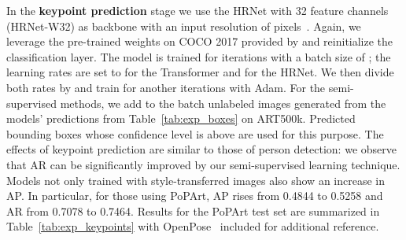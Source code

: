 \documentclass[sigconf]{acmart}
\begin{document}
\label{chp:exp_keypoint}
In the \textbf{keypoint prediction} stage we use the \acl{HRNet} with 32 feature channels (HRNet-W32) as backbone with an input resolution of  pixels~\cite{DBLP:conf/cvpr/0009XLW19}. 
Again, we leverage the pre-trained weights on COCO 2017 provided by \citet{DBLP:conf/cvpr/0012WZXXT21} and reinitialize the classification layer. 
The model is trained for  iterations with a batch size of ; the learning rates are set to  for the Transformer and  for the HRNet. 
We then divide both rates by  and train for another  iterations with Adam. 
For the semi-supervised methods, we add to the batch  unlabeled images generated from the models' predictions from Table~\ref{tab:exp_boxes} on ART500k. 
Predicted bounding boxes whose confidence level is above  are used for this purpose. 
The effects of keypoint prediction are similar to those of person detection: 
we observe that \ac{AR} can be significantly improved by our semi-supervised learning technique. 
Models not only trained with style-transferred images also show an increase in \ac{AP}. 
In particular, for those using \ac{PoPArt}, \ac{AP} rises from \num{0.4844} to \num{0.5258} and \ac{AR} from \num{0.7078} to \num{0.7464}. 
Results for the \ac{PoPArt} test set are summarized in Table~\ref{tab:exp_keypoints} with OpenPose~\cite{DBLP:journals/pami/CaoHSWS21} included for additional reference.
\end{document}
